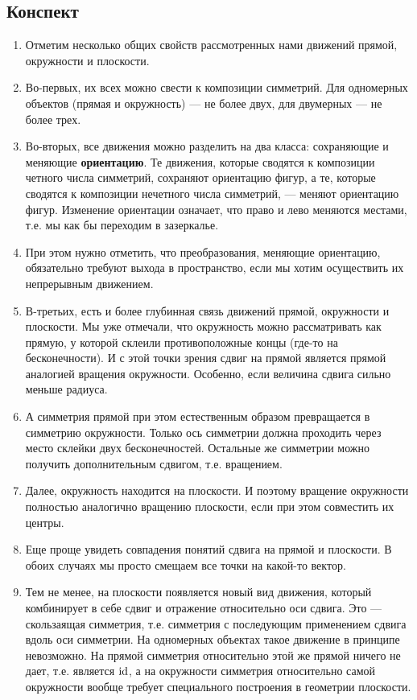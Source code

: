 \subsection{Конспект}
\begin{enumerate}
\item Отметим несколько общих свойств рассмотренных нами движений прямой, окружности и плоскости.
\item Во-первых, их всех можно свести к композиции симметрий. Для одномерных объектов (прямая и окружность) --- не более двух, для двумерных --- не более трех.
\item Во-вторых, все движения можно разделить на два класса: сохраняющие и меняющие \textbf{ориентацию}. Те движения, которые сводятся к композиции четного числа симметрий, сохраняют ориентацию фигур, а те, которые сводятся к композиции нечетного числа симметрий, --- меняют ориентацию фигур. Изменение ориентации означает, что право и лево меняются местами, т.е. мы как бы переходим в зазеркалье. 
\item При этом нужно отметить, что преобразования, меняющие ориентацию, обязательно требуют выхода в пространство, если мы хотим осуществить их непрерывным движением.
\item В-третьих, есть и более глубинная связь движений прямой, окружности и плоскости. Мы уже отмечали, что окружность можно рассматривать как прямую, у которой склеили противоположные концы (где-то на бесконечности). И с этой точки зрения сдвиг на прямой является прямой аналогией вращения окружности. Особенно, если величина сдвига сильно меньше радиуса.
\item А симметрия прямой при этом естественным образом превращается в симметрию окружности. Только ось симметрии должна проходить через место склейки двух бесконечностей. Остальные же симметрии можно получить дополнительным сдвигом, т.е. вращением.
\item Далее, окружность находится на плоскости. И поэтому вращение окружности полностью аналогично вращению плоскости, если при этом совместить их центры.
\item Еще проще увидеть совпадения понятий сдвига на прямой и плоскости. В обоих случаях мы просто смещаем все точки на какой-то вектор.
\item Тем не менее, на плоскости появляется новый вид движения, который комбинирует в себе сдвиг и отражение относительно оси сдвига. Это --- скользаящая симметрия, т.е. симметрия с последующим применением сдвига вдоль оси симметрии. На одномерных объектах такое движение в принципе невозможно. На прямой симметрия относительно этой же прямой ничего не дает, т.е. является $\mathrm{id}$, а на окружности симметрия относительно самой окружности вообще требует специального построения в геометрии плоскости.
\end{enumerate}


